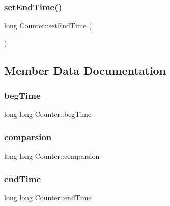 \hypertarget{class_counter_a338ac4f04d6f5924aa7ace3b14d9ffb9}{}\label{class_counter_a338ac4f04d6f5924aa7ace3b14d9ffb9} 
\subsubsection{\texorpdfstring{set\+End\+Time()}{setEndTime()}}
{\footnotesize\ttfamily long Counter\+::set\+End\+Time (\begin{DoxyParamCaption}{ }\end{DoxyParamCaption})}



\subsection{Member Data Documentation}
\hypertarget{class_counter_ae2f8fa6947d7daa4b977d4aae2ee3c43}{}\label{class_counter_ae2f8fa6947d7daa4b977d4aae2ee3c43} 
\subsubsection{\texorpdfstring{beg\+Time}{begTime}}
{\footnotesize\ttfamily long long Counter\+::beg\+Time\hspace{0.3cm}{\ttfamily [private]}}

\hypertarget{class_counter_a20f5a772c02412c338457dcc85c4a543}{}\label{class_counter_a20f5a772c02412c338457dcc85c4a543} 
\subsubsection{\texorpdfstring{comparsion}{comparsion}}
{\footnotesize\ttfamily long long Counter\+::comparsion\hspace{0.3cm}{\ttfamily [private]}}

\hypertarget{class_counter_a961ca391c9a8e3ac0efb8d6d61d734d4}{}\label{class_counter_a961ca391c9a8e3ac0efb8d6d61d734d4} 
\subsubsection{\texorpdfstring{end\+Time}{endTime}}
{\footnotesize\ttfamily long long Counter\+::end\+Time\hspace{0.3cm}{\ttfamily [private]}}

